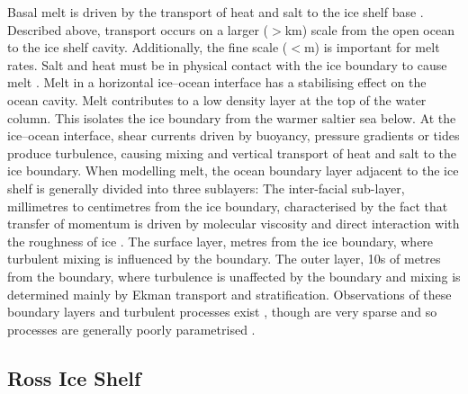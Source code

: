 Basal melt is driven by the transport of heat and salt to the ice shelf base \citep{holland1999modeling}. Described above, transport occurs on a  larger ($>$km) scale from the open ocean to the ice shelf cavity. Additionally, the fine scale ($<$m) is important for melt rates. Salt and heat must be in physical contact with the ice boundary to cause melt \citep[e.g.][]{jenkins2010observation}. 
Melt in a horizontal ice--ocean interface has a stabilising effect on the ocean cavity. Melt contributes to a low density layer at the top of the water column. This isolates the ice boundary from the warmer saltier sea below. At the ice--ocean interface, shear currents driven by buoyancy, pressure gradients or tides produce turbulence, causing mixing and vertical transport of heat and salt to the ice boundary. When modelling melt, the ocean boundary layer adjacent to the ice shelf is generally divided into three sublayers: The inter-facial sub-layer, millimetres to centimetres from the ice boundary, characterised by the fact that transfer of momentum is driven by molecular viscosity and direct interaction with the roughness of ice \citep{jenkins2010observation}. 
The surface layer, metres from the ice boundary, where turbulent mixing is influenced by the boundary. The outer layer, 10s of metres from the boundary, where turbulence is unaffected by the boundary and mixing is determined mainly by Ekman transport and stratification. Observations of these boundary layers and turbulent processes exist \citep[e.g.][]{jenkins2010observation,davis2019turbulence}, though are very sparse and so processes are generally poorly parametrised \citep[e.g.][]{jenkins2010observation,malyarenko2020synthesis}.
 

\newpage
\subsection{Ross Ice Shelf} \label{ross_ice_shelf}

